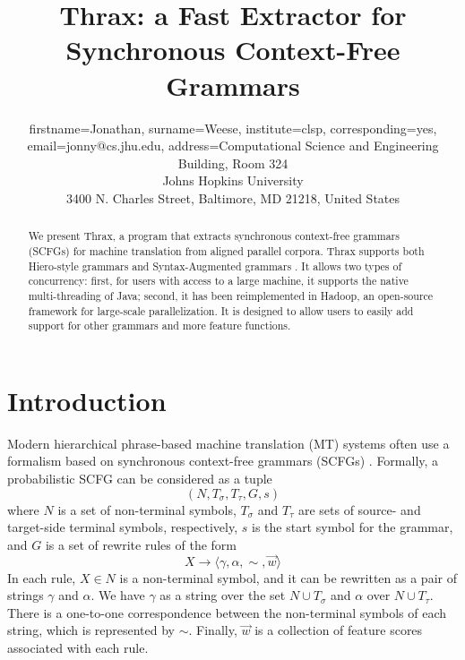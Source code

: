 \documentclass{pbml}
\begin{document}
\title{Thrax: a Fast Extractor for Synchronous Context-Free Grammars}
\author{firstname=Jonathan, surname=Weese, institute={clsp}, corresponding=yes, email={jonny@cs.jhu.edu}, address={Computational Science and Engineering Building, Room 324 \\ Johns Hopkins University \\ 3400 N. Charles Street, Baltimore, MD 21218, United States}}



\maketitle

\begin{abstract}
We present Thrax, a program that extracts synchronous context-free grammars (SCFGs) for machine translation from aligned parallel corpora. Thrax supports both Hiero-style grammars \cite{Chiang2007} and Syntax-Augmented grammars \cite{samt2006}. It allows two types of concurrency: first, for users with access to a large machine, it supports the native multi-threading of Java; second, it has been reimplemented in Hadoop, an open-source framework for large-scale parallelization. It is designed to allow users to easily add support for other grammars and more feature functions.
\end{abstract}

\section{Introduction}

Modern hierarchical phrase-based machine translation (MT) systems often use a formalism based on synchronous context-free grammars (SCFGs) \cite{Chiang2006}. Formally, a probabilistic SCFG can be considered as a tuple
$$(N,T_\sigma,T_\tau,G,s)$$
where $N$ is a set of non-terminal symbols, $T_\sigma$ and $T_\tau$ are sets of source- and target-side terminal symbols, respectively, $s$ is the start symbol for the grammar, and $G$ is a set of rewrite rules of the form
$$X \to \langle \gamma,\alpha,\sim,\vec{w} \rangle$$
In each rule, $X \in N$ is a non-terminal symbol, and it can be rewritten as a pair of strings $\gamma$ and $\alpha$. We have $\gamma$ as a string over the set $N \cup T_\sigma$ and $\alpha$ over $N \cup T_\tau$. There is a one-to-one correspondence between the non-terminal symbols of each string, which is represented by $\sim$. Finally, $\vec{w}$ is a collection of feature scores associated with each rule.
\end{document}
